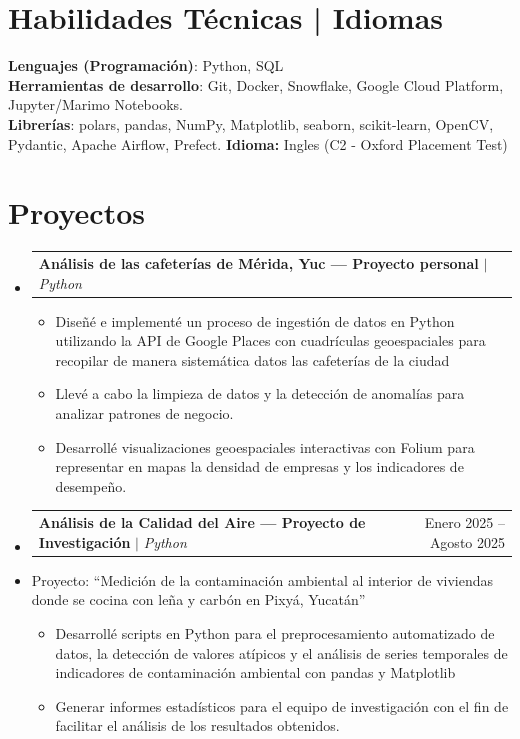 \documentclass[letterpaper,11pt]{article}
\makeatletter
\newcommand{\resumeItem}[1]{
  \item\small{
    {#1 \vspace{-2pt}}
  }
}
\newcommand{\resumeProjectHeading}[2]{
    \item
    \begin{tabular*}{0.97\textwidth}{l@{\extracolsep{\fill}}r}
      \small#1 & #2 \\
    \end{tabular*}\vspace{-7pt}
}
\newcommand{\resumeSubHeadingListStart}{\begin{itemize}[leftmargin=0.15in, label={}]}
\newcommand{\resumeSubHeadingListEnd}{\end{itemize}}
\newcommand{\resumeItemListStart}{\begin{itemize}}
\newcommand{\resumeItemListEnd}{\end{itemize}\vspace{-5pt}}
\makeatother
\begin{document}
\section{Habilidades Técnicas | Idiomas}
 \begin{itemize}[leftmargin=0.15in, label={}]
    \small{\item{
     \textbf{Lenguajes (Programación)}{: Python, SQL} \\
     \textbf{Herramientas de desarrollo}{: Git, Docker, Snowflake, Google Cloud Platform, Jupyter/Marimo Notebooks.} \\
     \textbf{Librerías}{: polars, pandas, NumPy, Matplotlib, seaborn, scikit-learn, OpenCV, Pydantic, Apache Airflow, Prefect.}
     \textbf{Idioma: }{Ingles (C2 - Oxford Placement Test)}
    }}
 \end{itemize}



\section{Proyectos}
    \resumeSubHeadingListStart
      \resumeProjectHeading
          {\textbf{Análisis de las cafeterías de Mérida, Yuc — Proyecto personal} $|$ \emph{Python}}{}
          \resumeItemListStart
            \resumeItem{Diseñé e implementé un proceso de ingestión de datos en Python utilizando la API de Google Places con cuadrículas geoespaciales para recopilar de manera sistemática datos las cafeterías de la ciudad}
            \resumeItem{Llevé a cabo la limpieza de datos y la detección de anomalías para analizar patrones de negocio.}
            \resumeItem{Desarrollé visualizaciones geoespaciales interactivas con Folium para representar en mapas la densidad de empresas y los indicadores de desempeño.}
          \resumeItemListEnd
      \resumeProjectHeading
          {\textbf{Análisis de la Calidad del Aire — Proyecto de Investigación} $|$ \emph{Python}}{Enero 2025 -- Agosto 2025}
          \resumeItem{Proyecto: “Medición de la contaminación ambiental al interior de viviendas donde se cocina con leña y carbón en Pixyá, Yucatán”}
          \resumeItemListStart
            \resumeItem{Desarrollé scripts en Python para el preprocesamiento automatizado de datos, la detección de valores atípicos y el análisis de series temporales de indicadores de contaminación ambiental con pandas y Matplotlib}
            \resumeItem{Generar informes estadísticos para el equipo de investigación con el fin de facilitar el análisis de los resultados obtenidos.}
          \resumeItemListEnd
    \resumeSubHeadingListEnd



%
\end{document}
